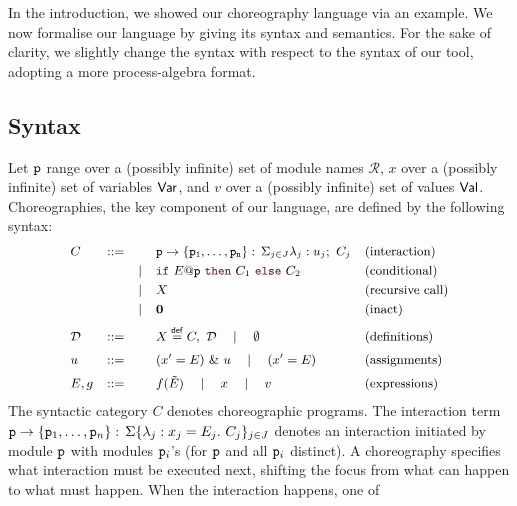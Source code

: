 In the introduction, we showed our choreography language via an
example. We now formalise our language by giving its syntax and
semantics. For the sake of clarity, we slightly change the syntax with
respect to the syntax of our tool, adopting a more process-algebra
format.

\subsection{Syntax} 
%
Let $\mathtt{p}$ range over a (possibly infinite) set of module names
$\mathcal R$, $x$ over a (possibly infinite) set of variables $\mathsf{Var}$,
and $v$ over a (possibly infinite) set of values $\mathsf{Val}$.
%
Choreographies, the key component of our language, are defined by the
following syntax:
%
\begin{displaymath}\small
  \begin{array}{llllllllllll}
    C & ::= &      & \interact{p}{\role p_1,\ldots,\role p_n} & \text{(interaction)}\\[1mm]
      &     & \mid & \ifTE {E}{p}{C_1}{C_2} & \text{(conditional)}\\[1mm]
      &     & \mid & X     & \text{(recursive call)}\\[1mm]
      &     & \mid & \CEnd & \text{(inact)}
    \\[2mm]
    \defin \ & ::= & & X\stackrel{\mathsf{def}}{=} C,\ \defin 
                     \quad \mid \quad \emptyset & \text{(definitions)}
    \\[2mm]
    u     & ::=  && (x' = E)\ \&\ u \quad\mid\quad    (x' = E) & \text{(assignments)}\\[2mm]
    E, g  & ::=  && f(\tilde E)\quad\mid\quad x\quad\mid\quad v & \text{(expressions)}
  \end{array}
\end{displaymath}
%
The syntactic category $C$ denotes choreographic programs. The
interaction term
$\mathtt{p}\rightarrow \{\mathtt{p}_1,\ldots,\mathtt{p}_n\}:\,\Sigma\{\lambda_j: x_j=E_j.\ C_j\}_{j\in J}$ denotes an
interaction initiated by module $\mathtt{p}$ with modules $\mathtt{p}_i$'s
(for $\mathtt{p}$ and all $\mathtt{p}_i$ distinct). A choreography specifies
what interaction must be executed next, shifting the focus from what
can happen to what must happen. When the interaction happens, one of
